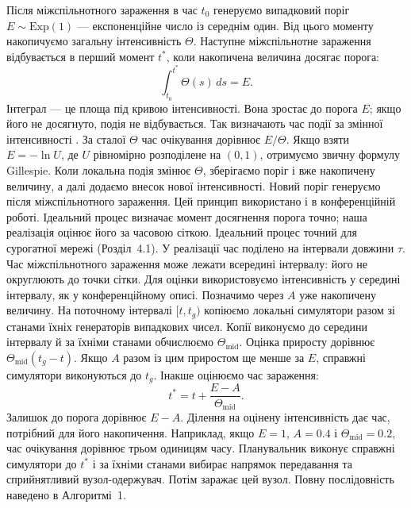 \documentclass[11pt,a4paper]{article}
\newcommand{\Exp}{\mathrm{Exp}}
\begin{document}
Після міжспільнотного зараження в час $t_0$ генеруємо випадковий поріг $E\sim\Exp(1)$ --- експоненційне число із середнім один. Від цього моменту накопичуємо загальну інтенсивність $\Theta$. Наступне міжспільнотне зараження відбувається в перший момент $t^\ast$, коли накопичена величина досягає порога:
\begin{equation*}\int_{t_0}^{t^\ast}\Theta(s)\,ds=E.\tag{5}
\end{equation*}
Інтеграл --- це площа під кривою інтенсивності. Вона зростає до порога $E$; якщо його не досягнуто, подія не відбувається. Так визначають час події за змінної інтенсивності \citep{ethier1986,anderson2007}. За сталої $\Theta$ час очікування дорівнює $E/\Theta$. Якщо взяти $E=-\ln U$, де $U$ рівномірно розподілене на $(0,1)$, отримуємо звичну формулу Gillespie. Коли локальна подія змінює $\Theta$, зберігаємо поріг і вже накопичену величину, а далі додаємо внесок нової інтенсивності. Новий поріг генеруємо після міжспільнотного зараження. Цей принцип використано і в конференційній роботі. Ідеальний процес визначає момент досягнення порога точно; наша реалізація оцінює його за часовою сіткою. Ідеальний процес точний для сурогатної мережі (Розділ~4.1).
У реалізації час поділено на інтервали довжини $\tau$. Час міжспільнотного зараження може лежати всередині інтервалу: його не округлюють до точки сітки. Для оцінки використовуємо інтенсивність у середині інтервалу, як у конференційному описі. Позначимо через $A$ уже накопичену величину. На поточному інтервалі $[t,t_g)$ копіюємо локальні симулятори разом зі станами їхніх генераторів випадкових чисел. Копії виконуємо до середини інтервалу й за їхніми станами обчислюємо $\Theta_{\mathrm{mid}}$. Оцінка приросту дорівнює $\Theta_{\mathrm{mid}}(t_g-t)$. Якщо $A$ разом із цим приростом ще менше за $E$, справжні симулятори виконуються до $t_g$. Інакше оцінюємо час зараження:
\begin{equation*}t^\ast=t+\frac{E-A}{\Theta_{\mathrm{mid}}}.\tag{6}
\end{equation*}
Залишок до порога дорівнює $E-A$. Ділення на оцінену інтенсивність дає час, потрібний для його накопичення. Наприклад, якщо $E=1$, $A=0.4$ і $\Theta_{\mathrm{mid}}=0.2$, час очікування дорівнює трьом одиницям часу. Планувальник виконує справжні симулятори до $t^\ast$ і за їхніми станами вибирає напрямок передавання та сприйнятливий вузол-одержувач. Потім заражає цей вузол. Повну послідовність наведено в Алгоритмі~1.
\end{document}
